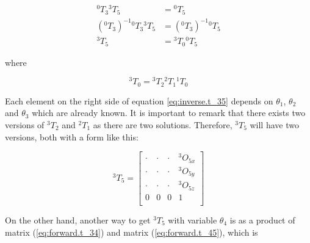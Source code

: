 \documentclass{article}
\newcommand{\T}[2]{{}^{#1}T_{#2}}
\renewcommand{\O}[2]{{}^{#1}O_{#2}}
\begin{document}
\begin{align}
\label{eq:inverse.t_35}
\T{0}{3}\T{3}{5} & = \T{0}{5} \nonumber \\
{(\T{0}{3})}^{-1}\T{0}{3}\T{3}{5}& = {(\T{0}{3})}^{-1} \T{0}{5} \nonumber \\
\T{3}{5} & = \T{3}{0} \T{0}{5}
\end{align}

where

\begin{equation}
\label{eq:inverse.t_30}
\T{3}{0} = \T{3}{2}\T{2}{1}\T{1}{0} 
\end{equation}

Each element on the right side of equation \ref{eq:inverse.t_35} depends on $\theta_1$, $\theta_2$ and $\theta_3$ which are already known. It is important to remark that there exists two versions of $\T{3}{2}$ and $\T{2}{1}$ as there are two solutions. Therefore, $\T{3}{5}$ will have two versions, both with a form like this:

\begin{equation}
\label{eq:inverse.t_35_expanded}
\T{3}{5}= \left[
\begin{array}{cccc}
	\cdot & \cdot & \cdot & \O{3}{5x} \\
	\cdot & \cdot & \cdot & \O{3}{5y} \\
	\cdot & \cdot & \cdot & \O{3}{5z} \\
    0 & 0 & 0 & 1 \\
\end{array}
\right] 
\end{equation}

On the other hand, another way to get $\T{3}{5}$ with variable $\theta_4$ is as a product of matrix (\ref{eq:forward.t_34}) and matrix (\ref{eq:forward.t_45}), which is
\end{document}
